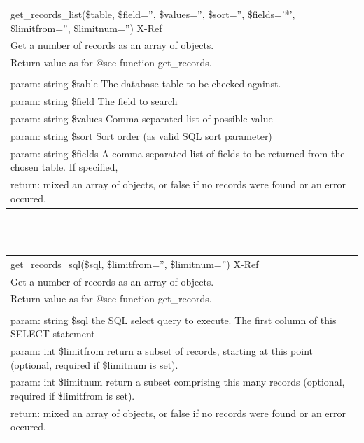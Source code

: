 \documentclass[a4paper]{report}  %
\begin{document}
\begin{tt}
\begin{center}
\begin{tabular}{| p{12cm} |}
	\end{tabular}
	\     \ \\ \     \ \\
   \begin{tabular}{| p{12cm} |} 
	\hline
	\rowcolor[gray]{0.5}get\_records\_list(\$table, \$field='', \$values='', \$sort='', \$fields='*', \$limitfrom='', \$limitnum='') X-Ref\\
	Get a number of records as an array of objects.\\
	\hline
	Return value as for @see function get\_records.\\
	\\
	param: string \$table The database table to be checked against.\\
	param: string \$field The field to search\\
	param: string \$values Comma separated list of possible value\\
	param: string \$sort Sort order (as valid SQL sort parameter)\\
	param: string \$fields A comma separated list of fields to be returned from the chosen table. If specified,\\
	return: mixed an array of objects, or false if no records were found or an error occured.\\
	\hline
	\end{tabular}
	\     \ \\ \     \ \\
   \begin{tabular}{| p{12cm} |} 
	\hline
	\rowcolor[gray]{0.5}get\_records\_sql(\$sql, \$limitfrom='', \$limitnum='') X-Ref\\
	Get a number of records as an array of objects.\\
	\hline
	Return value as for @see function get\_records.\\
	\\
	param: string \$sql the SQL select query to execute. The first column of this SELECT statement\\
	param: int \$limitfrom return a subset of records, starting at this point (optional, required if \$limitnum is set).\\
	param: int \$limitnum return a subset comprising this many records (optional, required if \$limitfrom is set).\\
	return: mixed an array of objects, or false if no records were found or an error occured.\\
	\hline
	\end{tabular}
	\     \ \\ \     \ \\

\end{center}
\end{tt}
\end{document}
